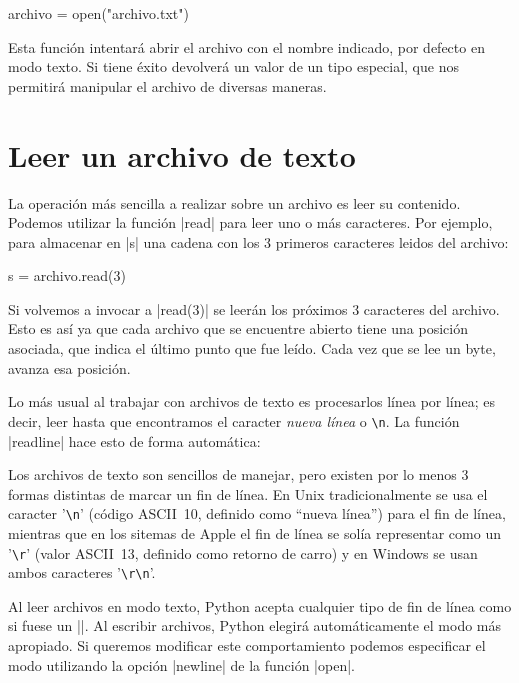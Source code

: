 \begin{codigo-python-sn}
archivo = open("archivo.txt")
\end{codigo-python-sn}

Esta función intentará abrir el archivo con el nombre indicado, por defecto en
modo texto. Si tiene éxito devolverá un valor de un tipo especial, que nos
permitirá manipular el archivo de diversas maneras.

\section{Leer un archivo de texto}

La operación más sencilla a realizar sobre un archivo es leer su contenido.
Podemos utilizar la función |read| para leer uno o más caracteres. Por ejemplo,
para almacenar en |s| una cadena con los 3 primeros caracteres leidos del archivo:

\begin{codigo-python-sn}
s = archivo.read(3)
\end{codigo-python-sn}

Si volvemos a invocar a |read(3)| se leerán los próximos 3 caracteres del archivo.
Esto es así ya que cada archivo que se encuentre abierto tiene una
posición asociada, que indica el último punto que fue leído.  Cada vez que
se lee un byte, avanza esa posición.

Lo más usual al trabajar con archivos de texto es procesarlos línea por línea;
es decir, leer hasta que encontramos el caracter \emph{nueva línea} o \verb!\n!. La
función |readline| hace esto de forma automática:

\begin{sabias_que}
Los archivos de texto son sencillos de manejar, pero existen por lo menos 3
formas distintas de marcar un fin de línea. En Unix tradicionalmente se usa
el caracter '\verb!\n!' (código ASCII~10, definido como \enquote{nueva línea}) para
el fin de línea, mientras que en los sitemas de Apple el fin de línea se solía
representar como un '\verb!\r!' (valor ASCII~13, definido como retorno de
carro) y en Windows se usan ambos caracteres '\verb!\r\n!'.

Al leer archivos en modo texto, Python acepta cualquier tipo de fin
de línea como si fuese un |\n|. Al escribir archivos, Python elegirá
automáticamente el modo más apropiado. Si queremos modificar este
comportamiento podemos especificar el modo utilizando la opción |newline| de la
función |open|.
\end{sabias_que}

